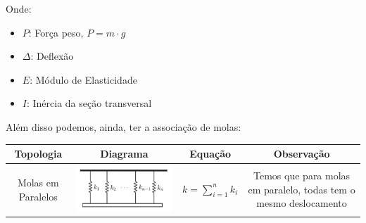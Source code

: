 \documentclass{article}
\begin{document}
Onde:
\begin{itemize}
    \item $P$: Força peso, $P = m\cdot g$
    \item $\Delta$: Deflexão
    \item $E$: Módulo de Elasticidade
    \item $I$: Inércia da seção transversal
\end{itemize}

\newpage

Além disso podemos, ainda, ter a associação de molas:
\begin{table}[h]
    \centering
    \begin{tabular}{|c|c|c|c|}
        \hline
        Topologia      & Diagrama & Equação & Observação                                                 \\ \hline
        Molas em Paralelos
                       &
        \begin{minipage}{.3\textwidth}
            \centering
            \includegraphics[width=.8\textwidth]{imgs/mola_eq_5.png}
        \end{minipage}
                       &
        $k = \sum_{i = 1}^n k_i$
                       &
        \begin{minipage}{.3\columnwidth}
            Temos que para molas em paralelo, todas tem o mesmo deslocamento%
        \end{minipage} \\ \hline


\end{tabular}
\end{table}
\end{document}
